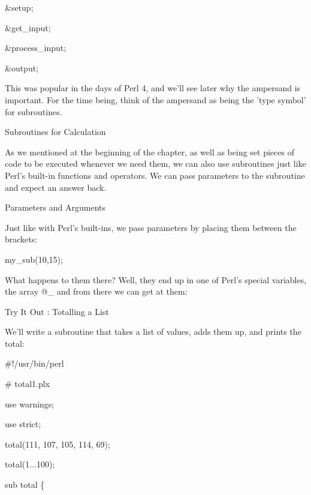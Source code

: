 \documentclass[a4paper,11pt]{book}
\begin{document}
\noindent \&setup;

\noindent \&get\_input;

\noindent \&process\_input;

\noindent \&output;

\noindent 

\noindent This was popular in the days of Perl 4, and we'll see later why the ampersand is important. For the time being, think of the ampersand as being the 'type symbol' for subroutines.

\noindent 

\noindent 

\noindent Subroutines for Calculation

\noindent As we mentioned at the beginning of the chapter, as well as being set pieces of code to be executed whenever we need them, we can also use subroutines just like Perl's built-in functions and operators. We can pass parameters to the subroutine and expect an answer back.

\noindent 

\noindent Parameters and Arguments

\noindent Just like with Perl's built-ins, we pass parameters by placing them between the brackets:

\noindent 

\noindent my\_sub(10,15);

\noindent 

\noindent What happens to them there? Well, they end up in one of Perl's special variables, the array @\_ and from there we can get at them:

\noindent 

\noindent Try It Out : Totalling a List

\noindent 

\noindent We'll write a subroutine that takes a list of values, adds them up, and prints the total:

\noindent 

\noindent \#!/usr/bin/perl

\noindent \# total1.plx

\noindent use warnings;

\noindent use strict;

\noindent 

\noindent total(111, 107, 105, 114, 69);

\noindent total(1...100);

\noindent 

\noindent sub total \{
\end{document}
